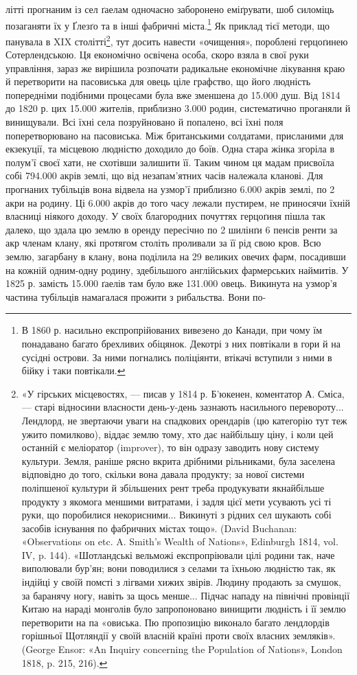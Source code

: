 літті прогнаним із сел ґаелам одночасно заборонено еміґрувати,
шоб силоміць позаганяти їх у Ґлезґо та в інші фабричні міста.\footnote{
В 1860 р. насильно експропрійованих вивезено до Канади, при
чому їм понадавано багато брехливих обіцянок. Декотрі з них повтікали
в гори й на сусідні острови. За ними погнались поліціянти, втікачі вступили
з ними в бійку і таки повтікали.
}
Як приклад тієї методи, що панувала в XIX столітті\footnote{
«У гірських місцевостях, — писав у 1814 р. Б’юкенен, коментатор
А. Сміса, — старі відносини власности день-у-день зазнають насильного
перевороту... Лендлорд, не звертаючи уваги на спадкових орендарів
(цю категорію тут теж ужито помилково), віддає землю тому, хто дає найбільшу
ціну, і коли цей останній є меліоратор (improver), то він одразу заводить
нову систему культури. Земля, раніше рясно вкрита дрібними рільниками,
була заселена відповідно до того, скільки вона давала продукту;
за нової системи поліпшеної культури й збільшених рент треба продукувати
якнайбільше продукту з якомога меншими витратами, і задля цієї
мети усувають усі ті руки, що поробилися некорисними... Викинуті з
рідних сел шукають собі засобів існування по фабричних містах тощо».
(David Buchanan: «Observations on etc. A. Smith’s Wealth of Nations»,
Edinburgh 1814, vol. IV, p. 144). «Шотландські вельможі експропріювали
цілі родини так, наче виполювали бур’ян; вони поводилися з селами
та їхньою людністю так, як індійці у своїй помсті з лігвами хижих звірів.
Людину продають за смушок, за баранячу ногу, навіть за щось
менше... Підчас нападу на північні провінції Китаю на нараді монголів
було запропоновано винищити людність і її землю перетворити на па «овиська.
Пю пропозицію виконало багато лендлордів горішньої Щотляндії
у своїй власній країні проти своїх власних земляків». (George
Ensor: «An Inquiry concerning the Population of Nations», London 1818,
p. 215, 216).
}, тут досить
навести «очищення», пороблені герцоґинею Сотерлендською.
Ця економічно освічена особа, скоро взяла в свої руки управління,
зараз же вирішила розпочати радикальне економічне лікування
краю й перетворити на пасовиська для овець ціле графство,
що його людність попередніми подібними процесами була
вже зменшена до 15.000 душ. Від 1814 до 1820 р. цих 15.000 жителів,
приблизно 3.000 родин, систематично проганяли й винищували.
Всі їхні села позруйновано й попалено, всі їхні поля
поперетворювано на пасовиська. Між британськими солдатами,
присланими для екзекуції, та місцевою людністю доходило до
боїв. Одна стара жінка згоріла в полум’ї своєї хати, не схотівши
залишити її. Таким чином ця мадам присвоїла собі 794.000 акрів
землі, що від незапам’ятних часів належала кланові. Для прогнаних
тубільців вона відвела на узмор’ї приблизно 6.000 акрів
землі, по 2 акри на родину. Ці 6.000 акрів до того часу лежали
пустирем, не приносячи їхній власниці ніякого доходу. У своїх
благородних почуттях герцоґиня пішла так далеко, що здала
цю землю в оренду пересічно по 2 шилінґи 6 пенсів ренти за акр
членам клану, які протягом століть проливали за її рід свою кров.
Всю землю, загарбану в клану, вона поділила на 29 великих
овечих фарм, посадивши на кожній одним-одну родину, здебільшого
англійських фармерських наймитів. У 1825 р. замість
15.000 ґаелів там було вже 131.000 овець. Викинута на узмор’я
частина тубільців намагалася прожити з рибальства. Вони по-